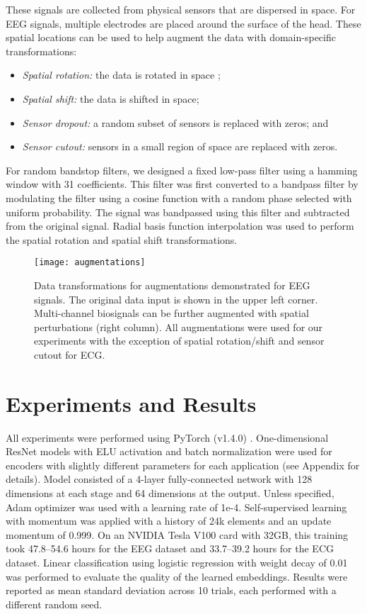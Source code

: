 \documentclass{article}
\begin{document}
These signals are collected from physical sensors that are dispersed in space.
For EEG signals, multiple electrodes are placed around the surface of the head.
These spatial locations can be used to help augment the data with
domain-specific transformations:
\begin{itemize}
  \setlength{\itemsep}{0pt}
  \item \textit{Spatial rotation:} the data is rotated in space \cite{krell_rotational_2017};
  \item \textit{Spatial shift:} the data is shifted in space;
  \item \textit{Sensor dropout:} a random subset of sensors is replaced with zeros; and
  \item \textit{Sensor cutout:} sensors in a small region of space are replaced
  with zeros.
\end{itemize}

For random bandstop filters, we designed a fixed low-pass filter using a hamming
window with 31 coefficients. This filter was first converted to a bandpass
filter by modulating the filter using a cosine function with a random phase
selected with uniform probability. The signal was bandpassed using this filter
and subtracted from the original signal. Radial basis function interpolation was
used to perform the spatial rotation and spatial shift transformations.

\begin{figure}
  \centering
  \texttt{[image: augmentations]}
  \caption{Data transformations for augmentations demonstrated for EEG signals.
  The original data input is shown in the upper left corner. Multi-channel
  biosignals can be further augmented with spatial perturbations (right column).
  All augmentations were used for our experiments with the exception of spatial
  rotation/shift and sensor cutout for ECG.}
  \label{fig:augmentation}
\end{figure}

 \section{Experiments and Results}

All experiments were performed using PyTorch (v1.4.0) \cite{NIPS2019_9015}.
One-dimensional ResNet models \cite{he_identity_2016} with ELU activation and
batch normalization \cite{ioffe_batch_2015} were used for encoders  with
slightly different parameters for each application (see Appendix for details).
Model  consisted of a 4-layer fully-connected network with 128 dimensions at
each stage and 64 dimensions at the output. Unless specified, Adam optimizer
\cite{kingma_adam_2017} was used with a learning rate of 1e-4. Self-supervised
learning with momentum was applied with a  history of 24k elements and an
update momentum of 0.999. On an NVIDIA Tesla V100 card with 32GB, this training
took 47.8--54.6 hours for the EEG dataset and 33.7--39.2 hours for the ECG
dataset. Linear classification using logistic regression with weight decay of
0.01 was performed to evaluate the quality of the learned embeddings. Results
were reported as mean  standard deviation across 10 trials, each performed
with a different random seed.
\end{document}
